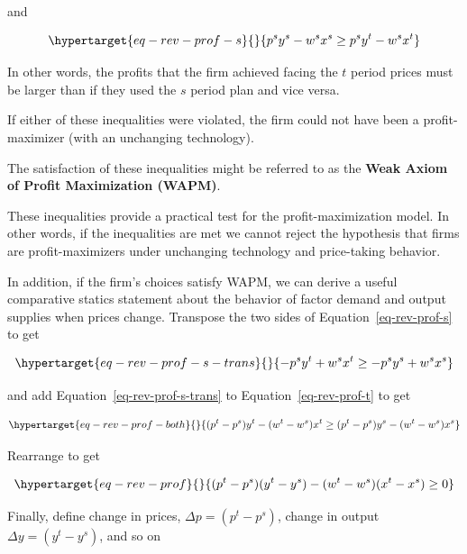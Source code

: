 \documentclass[
]{article}
\begin{document}
and

\begin{equation}\protect\hypertarget{eq-rev-prof-s}{}{
p^sy^s-w^sx^s\ge p^sy^t-w^sx^t
}\label{eq-rev-prof-s}\end{equation}

In other words, the profits that the firm achieved facing the \(t\)
period prices must be larger than if they used the \(s\) period plan and
vice versa.

If either of these inequalities were violated, the firm could not have
been a profit-maximizer (with an unchanging technology).

The satisfaction of these inequalities might be referred to as the
\textbf{Weak Axiom of Profit Maximization (WAPM)}.

These inequalities provide a practical test for the profit-maximization
model. In other words, if the inequalities are met we cannot reject the
hypothesis that firms are profit-maximizers under unchanging technology
and price-taking behavior.

In addition, if the firm's choices satisfy WAPM, we can derive a useful
comparative statics statement about the behavior of factor demand and
output supplies when prices change. Transpose the two sides of
Equation~\ref{eq-rev-prof-s} to get

\begin{equation}\protect\hypertarget{eq-rev-prof-s-trans}{}{
-p^sy^t+w^sx^t\ge -p^sy^s+w^sx^s
}\label{eq-rev-prof-s-trans}\end{equation}

and add Equation~\ref{eq-rev-prof-s-trans} to
Equation~\ref{eq-rev-prof-t} to get

\begin{equation}\protect\hypertarget{eq-rev-prof-both}{}{
\begin{aligned}
(p^t-p^s)y^t-(w^t-w^s)x^t \ge (p^t-p^s)y^s-(w^t-w^s)x^s
\end{aligned}
}\label{eq-rev-prof-both}\end{equation}

Rearrange to get

\begin{equation}\protect\hypertarget{eq-rev-prof}{}{
(p^t-p^s)(y^t-y^s)-(w^t-w^s)(x^t-x^s) \ge 0
}\label{eq-rev-prof}\end{equation}

Finally, define change in prices, \(\Delta p=(p^t-p^s)\), change in
output \(\Delta y = (y^t-y^s)\), and so on
\end{document}

